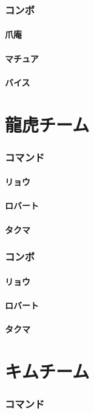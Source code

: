 \documentclass[a4j,11pt]{jarticle}
\begin{document}
\section{コンボ}
\subsection{爪庵}
\subsection{マチュア}
\subsection{バイス}
\part{龍虎チーム}%
\section{コマンド}
\subsection{リョウ}
\subsection{ロバート}
\subsection{タクマ}
\section{コンボ}
\subsection{リョウ}
\subsection{ロバート}
\subsection{タクマ}
\part{キムチーム}%
\section{コマンド}
\end{document}
